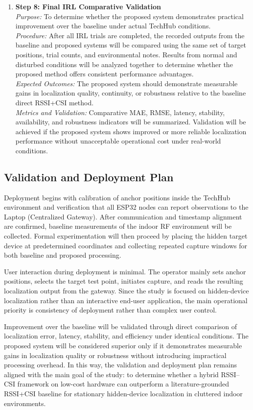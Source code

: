 \begin{enumerate}
    \item \textbf{Step 8: Final IRL Comparative Validation} \\
    \textit{Purpose:} To determine whether the proposed system demonstrates practical improvement over the baseline under actual TechHub conditions. \\
    \textit{Procedure:} After all IRL trials are completed, the recorded outputs from the baseline and proposed systems will be compared using the same set of target positions, trial counts, and environmental notes. Results from normal and disturbed conditions will be analyzed together to determine whether the proposed method offers consistent performance advantages. \\
    \textit{Expected Outcomes:} The proposed system should demonstrate measurable gains in localization quality, continuity, or robustness relative to the baseline direct RSSI+CSI method. \\
    \textit{Metrics and Validation:} Comparative MAE, RMSE, latency, stability, availability, and robustness indicators will be summarized. Validation will be achieved if the proposed system shows improved or more reliable localization performance without unacceptable operational cost under real-world conditions.
\end{enumerate}

\subsection{Validation and Deployment Plan}

Deployment begins with calibration of anchor positions inside the TechHub environment and verification that all ESP32 nodes can report observations to the Laptop (Centralized Gateway). After communication and timestamp alignment are confirmed, baseline measurements of the indoor RF environment will be collected. Formal experimentation will then proceed by placing the hidden target device at predetermined coordinates and collecting repeated capture windows for both baseline and proposed processing.

User interaction during deployment is minimal. The operator mainly sets anchor positions, selects the target test point, initiates capture, and reads the resulting localization output from the gateway. Since the study is focused on hidden-device localization rather than an interactive end-user application, the main operational priority is consistency of deployment rather than complex user control.

Improvement over the baseline will be validated through direct comparison of localization error, latency, stability, and efficiency under identical conditions. The proposed system will be considered superior only if it demonstrates measurable gains in localization quality or robustness without introducing impractical processing overhead. In this way, the validation and deployment plan remains aligned with the main goal of the study: to determine whether a hybrid RSSI--CSI framework on low-cost hardware can outperform a literature-grounded RSSI+CSI baseline for stationary hidden-device localization in cluttered indoor environments.
